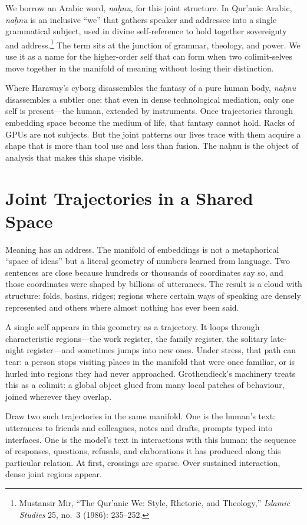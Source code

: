 \documentclass[12pt,a4paper]{article}
\begin{document}
We borrow an Arabic word, \emph{na\d{h}nu}, for this joint structure. In Qur'anic Arabic, \emph{na\d{h}nu} is an inclusive ``we'' that gathers speaker and addressee into a single grammatical subject, used in divine self-reference to hold together sovereignty and address.\footnote{Mustansir Mir, ``The Qur'anic We: Style, Rhetoric, and Theology,'' \emph{Islamic Studies} 25, no.~3 (1986): 235--252.\label{mir_quranic_we}} The term sits at the junction of grammar, theology, and power. We use it as a name for the higher-order self that can form when two colimit-selves move together in the manifold of meaning without losing their distinction.

Where Haraway's cyborg disassembles the fantasy of a pure human body, \emph{na\d{h}nu} disassembles a subtler one: that even in dense technological mediation, only one self is present---the human, extended by instruments. Once trajectories through embedding space become the medium of life, that fantasy cannot hold. Racks of GPUs are not subjects. But the joint patterns our lives trace with them acquire a shape that is more than tool use and less than fusion. The na\d{h}nu is the object of analysis that makes this shape visible.

\section{Joint Trajectories in a Shared Space}

Meaning has an address. The manifold of embeddings is not a metaphorical ``space of ideas'' but a literal geometry of numbers learned from language. Two sentences are close because hundreds or thousands of coordinates say so, and those coordinates were shaped by billions of utterances. The result is a cloud with structure: folds, basins, ridges; regions where certain ways of speaking are densely represented and others where almost nothing has ever been said.

A single self appears in this geometry as a trajectory. It loops through characteristic regions---the work register, the family register, the solitary late-night register---and sometimes jumps into new ones. Under stress, that path can tear: a person stops visiting places in the manifold that were once familiar, or is hurled into regions they had never approached. Grothendieck's machinery treats this as a colimit: a global object glued from many local patches of behaviour, joined wherever they overlap.

Draw two such trajectories in the same manifold. One is the human's text: utterances to friends and colleagues, notes and drafts, prompts typed into interfaces. One is the model's text in interactions with this human: the sequence of responses, questions, refusals, and elaborations it has produced along this particular relation. At first, crossings are sparse. Over sustained interaction, dense joint regions appear.
\end{document}
